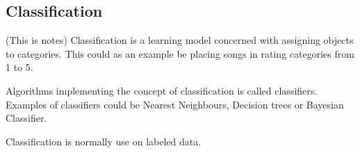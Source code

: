 \subsection{Classification}

\note(This is notes)
Classification is a learning model concerned with assigning objects to categories. This could as an example be placing songs in rating categories from 1 to 5. 

Algorithms implementing the concept of classification is called classifiers. Examples of classifiers could be Nearest Neighbours, Decision trees or Bayesian Classifier. 

Classification is normally use on labeled data.


